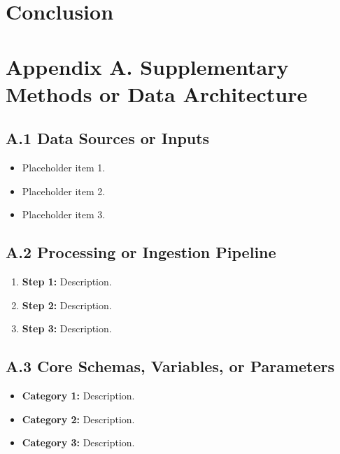 \documentclass[Afour,sagev,times]{sagej}
\begin{document}

\section{Conclusion}


\section*{Appendix A. Supplementary Methods or Data Architecture}


\subsection*{A.1 Data Sources or Inputs}

\begin{itemize}[leftmargin=*,itemsep=3pt]
    \item Placeholder item 1.
    \item Placeholder item 2.
    \item Placeholder item 3.
\end{itemize}

\subsection*{A.2 Processing or Ingestion Pipeline}

\begin{enumerate}[leftmargin=*,itemsep=3pt]
    \item \textbf{Step 1:} Description.
    \item \textbf{Step 2:} Description.
    \item \textbf{Step 3:} Description.
\end{enumerate}

\subsection*{A.3 Core Schemas, Variables, or Parameters}

\begin{itemize}[leftmargin=*,itemsep=3pt]
    \item \textbf{Category 1:} Description.
    \item \textbf{Category 2:} Description.
    \item \textbf{Category 3:} Description.
\end{itemize}
\end{document}
